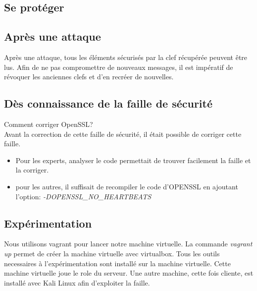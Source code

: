 \documentclass[a4paper,oneside,1pt]{article}
\begin{document}
\subsection{Se protéger}

\subsection{Après une attaque}

Après une attaque, tous les éléments sécurisés par la clef récupérée peuvent être lus. Afin de ne pas compromettre de nouveaux messages, il est impératif de révoquer les anciennes clefs et d'en recréer de nouvelles. 

\subsection{Dès connaissance de la faille de sécurité}
Comment corriger OpenSSL?\\
Avant la correction de cette faille de sécurité, il était possible de corriger cette faille. 
\begin{itemize}
	\item Pour les experts, analyser le code permettait de trouver facilement la faille et la corriger. 
	\item pour les autres, il suffisait de recompiler le code d'OPENSSL en ajoutant l'option: \textit{-DOPENSSL\_NO\_HEARTBEATS}
\end{itemize}



\subsection{Expérimentation}

Nous utilisons vagrant pour lancer notre machine virtuelle. La commande \textit{vagrant up} permet de créer la machine virtuelle avec virtualbox. Tous les outils necessaires à l'expérimentation sont installé sur la machine virtuelle. Cette machine virtuelle joue le role du serveur. Une autre machine, cette fois cliente, est installé avec Kali Linux afin d'exploiter la faille. 
\end{document}
